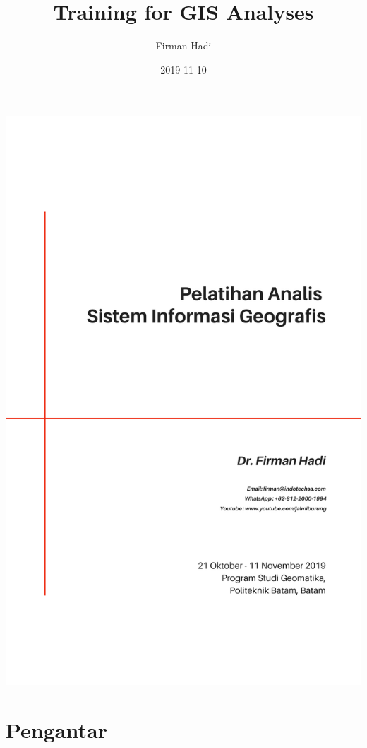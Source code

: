 \documentclass[]{book}
\title{Training for GIS Analyses}
\author{Firman Hadi}
\date{2019-11-10}
\begin{document}
\maketitle

\begin{center}
\includegraphics{cover.png}
\end{center}

{
\setcounter{tocdepth}{1}
\tableofcontents
}
\hypertarget{pengantar}{%
\chapter*{Pengantar}\label{pengantar}}
\end{document}
